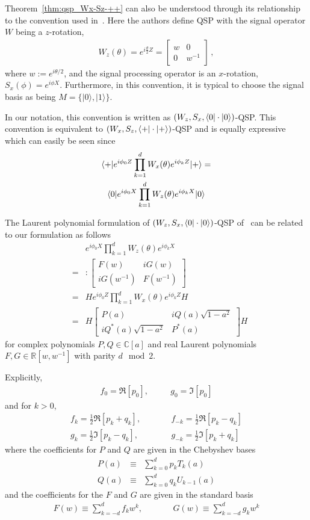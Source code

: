 \documentclass[aps,pra,showpacs,notitlepage,twocolumn,superscriptaddress,nofootinbib]{revtex4-1}
\def\>{\rangle}
\newcommand{\bea}{\begin{eqnarray}}
\newcommand{\eea}{\end{eqnarray}}
\newcommand{\mattwocb}[4]{\left[
	\begin{array}{cc}{#1}&{#2}\\{#3}&{#4}\end{array}\right]}
\begin{document}
Theorem~\ref{thm:qsp_Wx-Sz-++} can also be understood through its relationship to the convention used in~\cite{chao2020finding}.
Here the authors define QSP with the signal operator $W$ being a $z$-rotation,
\bea
W_z(\theta) = e^{i \frac{\theta}{2} Z} = \mattwocb{w}{0}{0}{w^{-1}}
\,,
\label{eq:wa_qsp_z}
\eea
where $w := e^{i\theta / 2}$, and the signal processing operator is an $x$-rotation, $S_x(\phi) = e^{i \phi X}$.  Furthermore, in this convention, it is typical to choose the signal basis as being $M=\{|0\>, |1\>\}$.

In our notation, this convention is written as $(W_z, S_x, \braket{0| \cdot |0})$-QSP.
This convention is equivalent to $(W_x, S_z, \braket{+| \cdot |+})$-QSP and is equally expressive which can easily be seen since
\begin{equation}\label{eq:Wx-Wz-equivalence}
    \begin{gathered}
        \braket{+| e^{i \phi_0 Z} \prod_{k=1}^d  W_x(\theta)  e^{i\phi_k Z} |+} = \\
        \braket{0| e^{i \phi_0 X} \prod_{k=1}^d  W_z(\theta)  e^{i\phi_k X} |0} 
    \end{gathered}
\end{equation}

The Laurent polynomial formulation of $(W_z, S_x, \braket{0| \cdot |0})$-QSP of~\cite{chao2020finding} can be related to our formulation as follows
\begin{eqnarray}
    &&e^{i \phi_0 X} \prod_{k=1}^d  W_z(\theta)  e^{i\phi_k X} \\
    \label{eq:fg_matrix}
    &=&: \mattwocb{F(w)}{i G(w)}{i G(w^{-1})}{F(w^{-1})} \\
    &=& H e^{i \phi_0 Z} \prod_{k=1}^d  W_x(\theta)  e^{i\phi_k Z} H \\
    &=& H \mattwocb{P(a)}{i Q(a) \sqrt{1 - a^2}}{i Q^*(a) \sqrt{1 - a^2}}{P^*(a)} H
\end{eqnarray}
for complex polynomials $P, Q \in \mathbb{C}[a]$ and real Laurent polynomials $F, G \in \mathbb{R}[w, w^{-1}]$ with parity $d \mod 2$.

Explicitly, 
\begin{eqnarray}
    f_0 = \Re[p_0],
    &\quad&
    g_0 = \Im[p_0]
\end{eqnarray}
and for $k > 0$,
\begin{eqnarray}
    f_k = \frac{1}{2} \Re[p_k + q_k],
    &\qquad&
    f_{-k} = \frac{1}{2} \Re[p_k - q_k]
    \\
    g_k = \frac{1}{2} \Im[p_k - q_k],
    &\qquad&
    g_{-k} = \frac{1}{2} \Im[p_k + q_k]
\end{eqnarray}
where the coefficients for $P$ and $Q$ are given in the Chebyshev bases
\begin{eqnarray}
    P(a) &\equiv& \sum_{k=0}^d p_k T_k(a) \\
    Q(a) &\equiv& \sum_{k=0}^d q_k U_{k-1}(a)
\end{eqnarray}
and the coefficients for the $F$ and $G$ are given in the standard basis
\begin{eqnarray}
    F(w) \equiv \sum_{k=-d}^d f_k w^{k},
    &\qquad&
    G(w) \equiv \sum_{k=-d}^d g_k w^{k}
\end{eqnarray}
\end{document}
